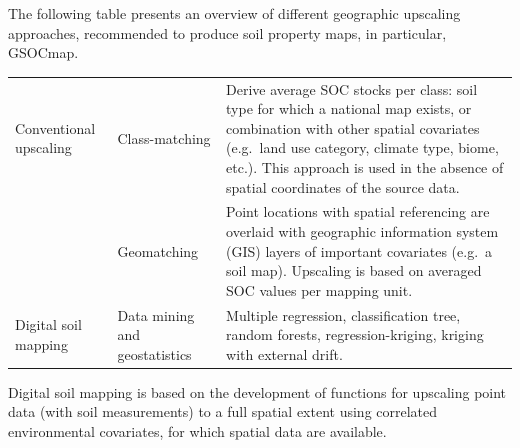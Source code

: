 \documentclass[10pt,b5paper,]{book}
\theoremstyle{definition}
\theoremstyle{definition}
\theoremstyle{definition}
\theoremstyle{remark}
\begin{document}
The following table presents an overview of different geographic
upscaling approaches, recommended to produce soil property maps, in
particular, GSOCmap.

\begin{longtable}[]{@{}lll@{}}
\toprule
\endhead
\begin{minipage}[t]{0.20\columnwidth}\raggedright
Conventional upscaling \citep{lettens2004soil}\strut
\end{minipage} & \begin{minipage}[t]{0.27\columnwidth}\raggedright
Class-matching\strut
\end{minipage} & \begin{minipage}[t]{0.44\columnwidth}\raggedright
Derive average SOC stocks per class: soil type for which a national map
exists, or combination with other spatial covariates (e.g.~land use
category, climate type, biome, etc.). This approach is used in the
absence of spatial coordinates of the source data.\strut
\end{minipage}\tabularnewline
\begin{minipage}[t]{0.20\columnwidth}\raggedright
\strut
\end{minipage} & \begin{minipage}[t]{0.27\columnwidth}\raggedright
Geomatching\strut
\end{minipage} & \begin{minipage}[t]{0.44\columnwidth}\raggedright
Point locations with spatial referencing are overlaid with geographic
information system (GIS) layers of important covariates (e.g.~a soil
map). Upscaling is based on averaged SOC values per mapping unit.\strut
\end{minipage}\tabularnewline
\begin{minipage}[t]{0.20\columnwidth}\raggedright
Digital soil mapping \citep{dobos2006digital}
\index{Digital Soil Mapping (DSM)}\strut
\end{minipage} & \begin{minipage}[t]{0.27\columnwidth}\raggedright
Data mining and geostatistics\strut
\end{minipage} & \begin{minipage}[t]{0.44\columnwidth}\raggedright
Multiple regression, classification tree, random forests,
regression-kriging, kriging with external drift.\strut
\end{minipage}\tabularnewline
\bottomrule
\end{longtable}

Digital soil mapping is based on the development of functions for
upscaling point data (with soil measurements) to a full spatial extent
using correlated environmental covariates, for which spatial data are
available.
\end{document}

